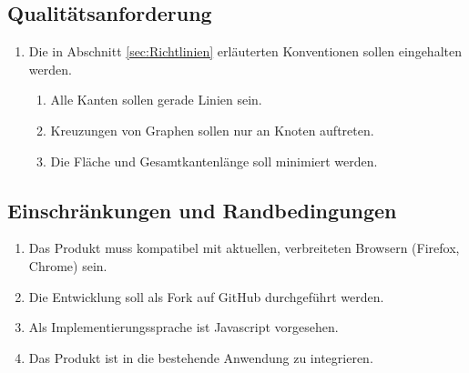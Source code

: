 \documentclass[nocolor]{tudbook}
\begin{document}
\subsection{Qualitätsanforderung}
\begin{enumerate}[Q1]
	\item Die in Abschnitt \ref{sec:Richtlinien} erläuterten Konventionen sollen eingehalten werden.
	\begin{enumerate}[{Q1}.1]
		\item Alle Kanten sollen gerade Linien sein.
		\item Kreuzungen von Graphen sollen nur an Knoten auftreten.
		\item Die Fläche und Gesamtkantenlänge soll minimiert werden.
	\end{enumerate}
\end{enumerate}

\subsection{Einschränkungen und Randbedingungen}
\begin{enumerate}[R1]
	\item Das Produkt muss kompatibel mit aktuellen, verbreiteten Browsern (Firefox, Chrome) sein.
	\item Die Entwicklung soll als Fork auf GitHub durchgeführt werden.
	\item Als Implementierungssprache ist Javascript vorgesehen.
	\item Das Produkt ist in die bestehende Anwendung zu integrieren.
\end{enumerate}
\end{document}
